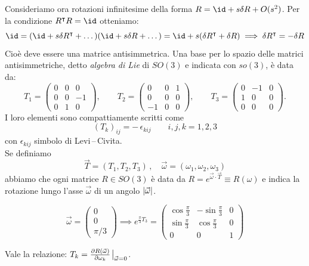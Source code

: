 Consideriamo ora rotazioni infinitesime della forma \(R = \id + s \delta R + O(s^2)\). Per la condizione \(R^\intercal R =\id\) otteniamo:
\[
    \id= (\id+s \delta R^\intercal + \dots )(\id+s \delta R+ \dots )= \id + s(\delta R^\intercal+\delta R )
    \implies \delta R^\intercal=-\delta R 
\]
Cioè deve essere una matrice antisimmetrica. Una base per lo spazio delle matrici antisimmetriche, detto \textit{algebra di Lie} di \(SO(3)\) e indicata con \(so(3)\), è data da:
\[
    T_1=\begin{pmatrix}
        0 & 0 & 0\\
        0 & 0 & -1\\
        0 & 1 & 0
    \end{pmatrix},\qquad
    T_2=\begin{pmatrix}
        0 & 0 & 1\\
        0 & 0 & 0\\
        -1 & 0 & 0
    \end{pmatrix},\qquad
    T_3=\begin{pmatrix}
        0 & -1 & 0\\
        1 & 0 & 0\\
        0 & 0 & 0
    \end{pmatrix} .
\]
I loro elementi sono compattiamente scritti come
\[
    (T_k)_{ij} = -\,\epsilon_{kij} \qquad i,j,k=1,2,3
\]
con $\epsilon_{kij}$ simbolo di Levi\,–\,Civita. \\
Se definiamo 
\[
    \vec T=(T_1,T_2,T_3)\,, \quad \vec\omega=(\omega_1,\omega_2,\omega_3)
\]
abbiamo che 
ogni matrice \(R \in SO(3)\) è data da \(R = e^{\vec{\omega}\cdot \vec{T}}\equiv R(\omega)\) e indica la rotazione lungo l'asse \(\vec{\omega}\) di un angolo \(\abs{\vec{\omega}}\).


\begin{example}
    \[
        \vec{\omega}= \begin{pmatrix}
            0\\0\\\pi/3
        \end{pmatrix}\implies e^{\frac{\pi}{3}T_3} = \begin{pmatrix}
            \cos \frac{\pi}{3}& - \sin \frac{\pi}{3} & 0\\
            \sin \frac{\pi}{3} &\cos \frac{\pi}{3} & 0\\
            0&0&1
        \end{pmatrix}
    \]
\end{example}
\begin{remark}
    Vale la relazione: \(T_k = \pdv{R(\vec{\omega})}{\omega_k}\eval_{\vec{\omega}=0}\).
\end{remark}

